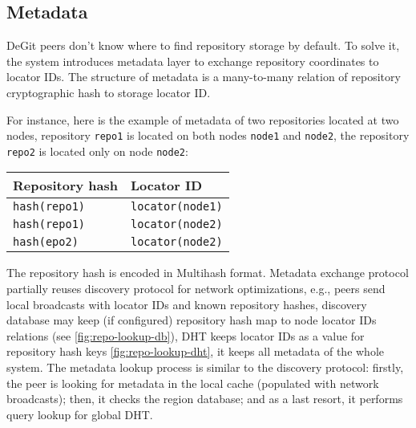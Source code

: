 \documentclass[acmlarge, screen, nonacm, 11pt]{acmart}
\newcommand{\code}[1]{\texttt{#1}}
\begin{document}
\subsection{Metadata}\label{sec:metadata}

DeGit peers don't know where to find repository storage by default.
To solve it, the system introduces metadata layer to exchange repository coordinates
to locator IDs. The structure of metadata is a many-to-many relation of
repository cryptographic hash to storage locator ID.

For instance, here is the example of metadata of two repositories located at two nodes,
repository \code{repo1} is located on both nodes \code{node1} and \code{node2},
the repository \code{repo2} is located only on node \code{node2}:

\begin{tabular}{l | l}
  Repository hash & Locator ID \\ \hline
  \code{hash(repo1)} & \code{locator(node1)} \\
  \code{hash(repo1)} & \code{locator(node2)} \\
  \code{hash(epo2)} & \code{locator(node2)} \\
\end{tabular}

The repository hash is encoded in Multihash format. Metadata exchange protocol partially reuses
discovery protocol for network optimizations, e.g., peers send local broadcasts
with locator IDs and known repository hashes, discovery database may keep (if configured)
repository hash map to node locator IDs relations (see \ref{fig:repo-lookup-db}),
DHT keeps locator IDs as a value for repository hash keys \ref{fig:repo-lookup-dht},
it keeps all metadata of the whole system. The metadata lookup process is similar to the discovery protocol:
firstly, the peer is looking for metadata in the local cache (populated with network broadcasts); then, it checks
the region database; and as a last resort, it performs query lookup for global DHT.
\end{document}

